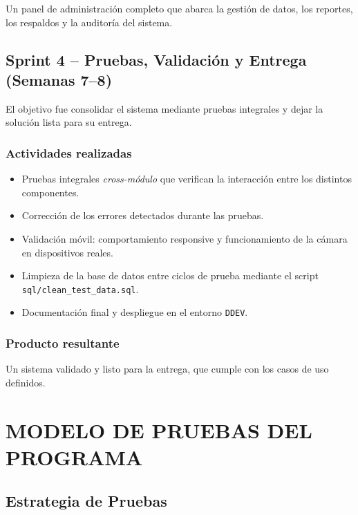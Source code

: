 \documentclass[12pt, letterpaper, oneside]{report}
\begin{document}
Un panel de administraci\'on completo que abarca la gesti\'on de datos, los reportes, los respaldos y la auditor\'ia del sistema.

\section{Sprint 4 -- Pruebas, Validaci\'on y Entrega (Semanas 7--8)}

El objetivo fue consolidar el sistema mediante pruebas integrales y dejar la soluci\'on lista para su entrega.

\subsection{Actividades realizadas}

\begin{itemize}
  \item Pruebas integrales \emph{cross-m\'odulo} que verifican la interacci\'on entre los distintos componentes.
  \item Correcci\'on de los errores detectados durante las pruebas.
  \item Validaci\'on m\'ovil: comportamiento responsive y funcionamiento de la c\'amara en dispositivos reales.
  \item Limpieza de la base de datos entre ciclos de prueba mediante el script \texttt{sql/clean\_test\_data.sql}.
  \item Documentaci\'on final y despliegue en el entorno \texttt{DDEV}.
\end{itemize}

\subsection{Producto resultante}

Un sistema validado y listo para la entrega, que cumple con los casos de uso definidos.

\newpage

\chapter{MODELO DE PRUEBAS DEL PROGRAMA}

\section{Estrategia de Pruebas}
\end{document}
